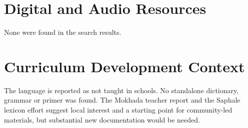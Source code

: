 \documentclass[12pt]{article}
\begin{document}
\section{Digital and Audio Resources}
None were found in the search results.

\section{Curriculum Development Context}
The language is reported as not taught in schools. No standalone dictionary, grammar or primer was found. The Mokhada teacher report and the Saphale lexicon effort suggest local interest and a starting point for community-led materials, but substantial new documentation would be needed.
\end{document}
